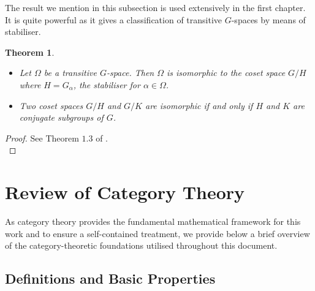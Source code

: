 \documentclass{article}
\theoremstyle{plain}
\newtheorem{theorem}{Theorem}[subsection]
\theoremstyle{definition}
\begin{document}
The result we mention in this subsection is used extensively in the first chapter.
It is quite powerful as it gives a classification of transitive $G$-spaces by means of stabiliser.
\begin{theorem}\textbf{ }
\label{Cameron_1_3}
    \begin{itemize}
        \item[$a)$] Let $\Omega$ be a transitive $G$-space. Then $\Omega$ is isomorphic to the coset space $G/H$ where $H = G_{\alpha}$, the stabiliser for $\alpha\in\Omega$.
        \item[$b)$] Two coset spaces $G/H$ and $G/K$ are isomorphic if and only if $H$ and $K$ are conjugate subgroups of $G$.
    \end{itemize}
\end{theorem}
\begin{proof}
    See Theorem $1.3$ of \cite{Cameron_groups}.\\
\end{proof}







\section{Review of Category Theory}

As category theory provides the fundamental mathematical framework for this work and to ensure a self-contained treatment, we provide below a brief overview of the category-theoretic foundations utilised throughout this document.


\subsection{Definitions and Basic Properties}
\end{document}
